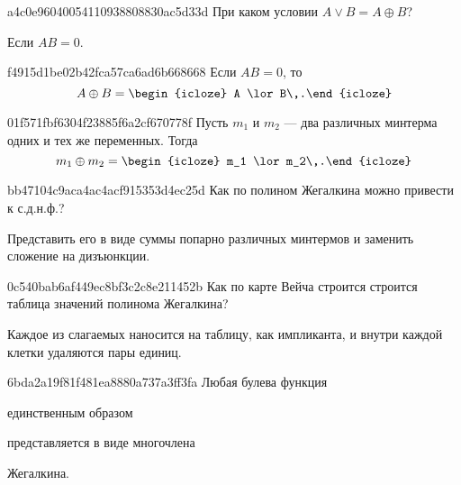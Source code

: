 \begin{note}{a4c0e96040054110938808830ac5d33d}
    При каком условии \({ A \lor B = A \oplus B }\)?

    \begin{cloze}{1}
        Если \({ AB = 0 }\).
    \end{cloze}
\end{note}

\begin{note}{f4915d1be02b42fca57ca6ad6b668668}
    Если \({ AB = 0 }\), то
    \[
        A \oplus B = \begin{icloze}{1}A \lor B\,.\end{icloze}
    \]
\end{note}

\begin{note}{01f571fbf6304f23885f6a2cf670778f}
    Пусть \({ m_1 }\) и \({ m_2 }\) --- два различных минтерма одних и тех же переменных.
    Тогда
    \[
        m_1 \oplus m_2 = \begin{icloze}{1}m_1 \lor m_2\,.\end{icloze}
    \]
\end{note}

\begin{note}{bb47104c9aca4ac4acf915353d4ec25d}
    Как по полином Жегалкина можно привести к с.д.н.ф.?

    \begin{cloze}{1}
        Представить его в виде суммы попарно различных минтермов и заменить сложение на дизъюнкции.
    \end{cloze}
\end{note}

\begin{note}{0c540bab6af449ec8bf3c2c8e211452b}
    Как по карте Вейча строится строится таблица значений полинома Жегалкина?

    \begin{cloze}{1}
        Каждое из слагаемых наносится на таблицу, как импликанта, и внутри каждой клетки удаляются пары единиц.
    \end{cloze}
\end{note}

\begin{note}{6bda2a19f81f481ea8880a737a3ff3fa}
    Любая булева функция \begin{icloze}{2}единственным образом\end{icloze} представляется в виде многочлена \begin{icloze}{1}Жегалкина.\end{icloze}
\end{note}

